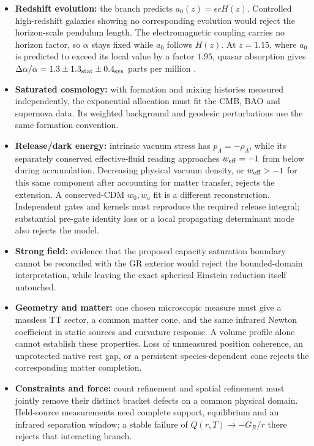 \documentclass[11pt]{article}
\begin{document}
\begin{itemize}
\item \textbf{Redshift evolution:} the branch predicts $a_0(z)=\epsilon cH(z)$. Controlled high-redshift galaxies showing no corresponding evolution would reject the horizon-scale pendulum length. The electromagnetic coupling carries no horizon factor, so $\alpha$ stays fixed while $a_0$ follows $H(z)$. At $z=1.15$, where $a_0$ is predicted to exceed its local value by a factor $1.95$, quasar absorption gives $\Delta\alpha/\alpha=1.3\pm1.3_{\rm stat}\pm0.4_{\rm sys}$ parts per million \citep{Murphy2022ESPRESSO}.
\item \textbf{Saturated cosmology:} with formation and mixing histories measured independently, the exponential allocation must fit the CMB, BAO and supernova data. Its weighted background and geodesic perturbations use the same formation convention.
\item \textbf{Release/dark energy:} intrinsic vacuum stress has $p_\Lambda=-\rho_\Lambda$, while its separately conserved effective-fluid reading approaches $w_{\rm eff}=-1$ from below during accumulation. Decreasing physical vacuum density, or $w_{\rm eff}>-1$ for this same component after accounting for matter transfer, rejects the extension. A conserved-CDM $w_0,w_a$ fit is a different reconstruction. Independent gates and kernels must reproduce the required release integral; substantial pre-gate identity loss or a local propagating determinant mode also rejects the model.
\item \textbf{Strong field:} evidence that the proposed capacity saturation boundary cannot be reconciled with the GR exterior would reject the bounded-domain interpretation, while leaving the exact spherical Einstein reduction itself untouched.
\item \textbf{Geometry and matter:} one chosen microscopic measure must give a massless TT sector, a common matter cone, and the same infrared Newton coefficient in static sources and curvature response. A volume profile alone cannot establish these properties. Loss of unmeasured position coherence, an unprotected native rest gap, or a persistent species-dependent cone rejects the corresponding matter completion.
\item \textbf{Constraints and force:} count refinement and spatial refinement must jointly remove their distinct bracket defects on a common physical domain. Held-source measurements need complete support, equilibrium and an infrared separation window; a stable failure of $Q(r,T)\to-G_R/r$ there rejects that interacting branch.
\end{itemize}
\end{document}
